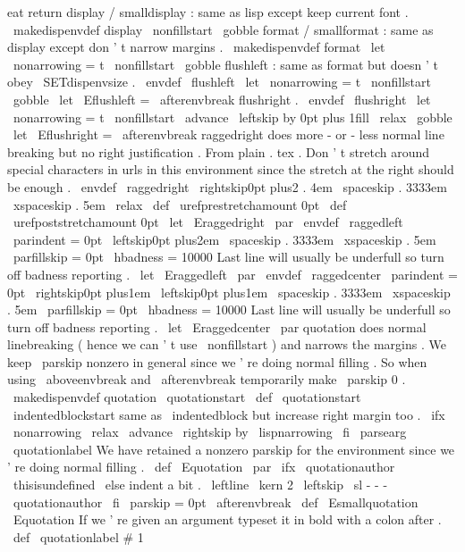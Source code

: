 {{{{%
eat
return
}
%
display
/
smalldisplay
:
same
as
lisp
except
keep
current
font
.
%
\
makedispenvdef
{
display
}
{
%
\
nonfillstart
\
gobble
}
%
format
/
smallformat
:
same
as
display
except
don
'
t
narrow
margins
.
%
\
makedispenvdef
{
format
}
{
%
\
let
\
nonarrowing
=
t
%
\
nonfillstart
\
gobble
}
%
flushleft
:
same
as
format
but
doesn
'
t
obey
\
SETdispenvsize
.
\
envdef
\
flushleft
{
%
\
let
\
nonarrowing
=
t
%
\
nonfillstart
\
gobble
}
\
let
\
Eflushleft
=
\
afterenvbreak
%
flushright
.
%
\
envdef
\
flushright
{
%
\
let
\
nonarrowing
=
t
%
\
nonfillstart
\
advance
\
leftskip
by
0pt
plus
1fill
\
relax
\
gobble
}
\
let
\
Eflushright
=
\
afterenvbreak
%
raggedright
does
more
-
or
-
less
normal
line
breaking
but
no
right
%
justification
.
From
plain
.
tex
.
Don
'
t
stretch
around
special
%
characters
in
urls
in
this
environment
since
the
stretch
at
the
right
%
should
be
enough
.
\
envdef
\
raggedright
{
%
\
rightskip0pt
plus2
.
4em
\
spaceskip
.
3333em
\
xspaceskip
.
5em
\
relax
\
def
\
urefprestretchamount
{
0pt
}
%
\
def
\
urefpoststretchamount
{
0pt
}
%
}
\
let
\
Eraggedright
\
par
\
envdef
\
raggedleft
{
%
\
parindent
=
0pt
\
leftskip0pt
plus2em
\
spaceskip
.
3333em
\
xspaceskip
.
5em
\
parfillskip
=
0pt
\
hbadness
=
10000
%
Last
line
will
usually
be
underfull
so
turn
off
%
badness
reporting
.
}
\
let
\
Eraggedleft
\
par
\
envdef
\
raggedcenter
{
%
\
parindent
=
0pt
\
rightskip0pt
plus1em
\
leftskip0pt
plus1em
\
spaceskip
.
3333em
\
xspaceskip
.
5em
\
parfillskip
=
0pt
\
hbadness
=
10000
%
Last
line
will
usually
be
underfull
so
turn
off
%
badness
reporting
.
}
\
let
\
Eraggedcenter
\
par
%
quotation
does
normal
linebreaking
(
hence
we
can
'
t
use
\
nonfillstart
)
%
and
narrows
the
margins
.
We
keep
\
parskip
nonzero
in
general
since
%
we
'
re
doing
normal
filling
.
So
when
using
\
aboveenvbreak
and
%
\
afterenvbreak
temporarily
make
\
parskip
0
.
%
\
makedispenvdef
{
quotation
}
{
\
quotationstart
}
%
\
def
\
quotationstart
{
%
\
indentedblockstart
%
same
as
\
indentedblock
but
increase
right
margin
too
.
\
ifx
\
nonarrowing
\
relax
\
advance
\
rightskip
by
\
lispnarrowing
\
fi
\
parsearg
\
quotationlabel
}
%
We
have
retained
a
nonzero
parskip
for
the
environment
since
we
'
re
%
doing
normal
filling
.
%
\
def
\
Equotation
{
%
\
par
\
ifx
\
quotationauthor
\
thisisundefined
\
else
%
indent
a
bit
.
\
leftline
{
\
kern
2
\
leftskip
\
sl
-
-
-
\
quotationauthor
}
%
\
fi
{
\
parskip
=
0pt
\
afterenvbreak
}
%
}
\
def
\
Esmallquotation
{
\
Equotation
}
%
If
we
'
re
given
an
argument
typeset
it
in
bold
with
a
colon
after
.
\
def
\
quotationlabel
#
1
{
%
\
}}}}
